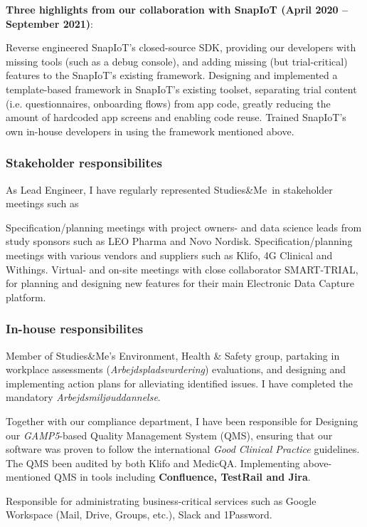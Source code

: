 \documentclass[10pt, a4paper]{article}
\newcommand{\sme}{Studies\&Me}
\begin{document}
\textbf{Three highlights from our collaboration with SnapIoT (April 2020 -- September 2021)}:
\begin{outline}
  \1 Reverse engineered SnapIoT's closed-source SDK, providing our developers with missing tools (such as a debug console), and adding missing (but trial-critical) features to the SnapIoT's existing framework.
  \1 Designing and implemented a template-based framework in SnapIoT's existing toolset, separating trial content (i.e. questionnaires, onboarding flows) from app code, greatly reducing the amount of hardcoded app screens and enabling code reuse.
  \1 Trained SnapIoT's own in-house developers in using the framework mentioned above.
\end{outline}

\subsubsection*{Stakeholder responsibilites}
As Lead Engineer, I have regularly represented \sme\ in stakeholder meetings such as 
\begin{outline}
  \1 Specification/planning meetings with project owners- and data science leads from study sponsors such as LEO Pharma and Novo Nordisk.
  \1 Specification/planning meetings with various vendors and suppliers such as Klifo, 4G Clinical and Withings.
  \1 Virtual- and on-site meetings with close collaborator SMART-TRIAL, for planning and designing new features for their main Electronic Data Capture platform.
\end{outline}

\subsubsection*{In-house responsibilites}
\begin{outline}
  \1 Member of \sme's Environment, Health \& Safety group, partaking in workplace assessments (\textit{Arbejdspladsvurdering}) evaluations, and designing and implementing action plans for alleviating identified issues. I have completed the mandatory \textit{Arbejdsmiljøuddannelse}.

\1 Together with our compliance department, I have been responsible for
  \2 Designing our \textit{GAMP5}-based Quality Management System (QMS), ensuring that our software was proven to follow the international \textit{Good Clinical Practice} guidelines. The QMS been audited by both Klifo and MedicQA.
  \2 Implementing above-mentioned QMS in tools including \textbf{Confluence, TestRail and Jira}.

\1 Responsible for administrating business-critical services such as Google Workspace (Mail, Drive, Groups, etc.), Slack and 1Password.
\end{outline}
\pagebreak
\end{document}
